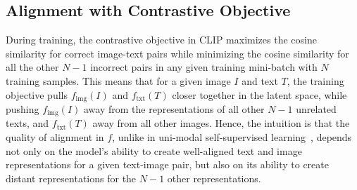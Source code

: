 \subsection{Alignment with Contrastive Objective}
During training, the contrastive objective in CLIP maximizes the cosine similarity for correct image-text pairs while minimizing the cosine similarity for all the other $N-1$ incorrect pairs in any given training mini-batch with $N$ training samples. This means that for a given image $I$ and text $T$, the training objective pulls $f_{\text{img}}(I)$ and $f_{\text{txt}}(T)$ closer together in the latent space, while pushing $f_{\text{img}}(I)$ away from the representations of all other $N-1$ unrelated texts, and $f_{\text{txt}}(T)$ away from all other images. Hence, the intuition is that the quality of alignment in $f$, unlike in uni-modal self-supervised learning~\citep{wang2024memorization}, depends not only on the model's ability to create well-aligned text and image representations for a given text-image pair, but also on its ability to create distant representations for the $N-1$ other representations.


